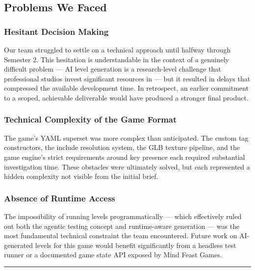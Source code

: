 \subsection{Problems We Faced}\label{problems-we-faced}

\subsubsection{Hesitant Decision Making}\label{hesitant-decision-making}

Our team struggled to settle on a technical approach until halfway
through Semester 2. This hesitation is understandable in the context of
a genuinely difficult problem --- AI level generation is a
research-level challenge that professional studios invest significant
resources in --- but it resulted in delays that compressed the available
development time. In retrospect, an earlier commitment to a scoped,
achievable deliverable would have produced a stronger final product.

\subsubsection{Technical Complexity of the Game
Format}\label{technical-complexity-of-the-game-format}

The game's YAML superset was more complex than anticipated. The custom
tag constructors, the include resolution system, the GLB texture
pipeline, and the game engine's strict requirements around key presence
each required substantial investigation time. These obstacles were
ultimately solved, but each represented a hidden complexity not visible
from the initial brief.

\subsubsection{Absence of Runtime
Access}\label{absence-of-runtime-access}

The impossibility of running levels programmatically --- which
effectively ruled out both the agentic testing concept and runtime-aware
generation --- was the most fundamental technical constraint the team
encountered. Future work on AI-generated levels for this game would
benefit significantly from a headless test runner or a documented game
state API exposed by Mind Feast Games.

\begin{center}\rule{0.5\linewidth}{0.5pt}\end{center}

